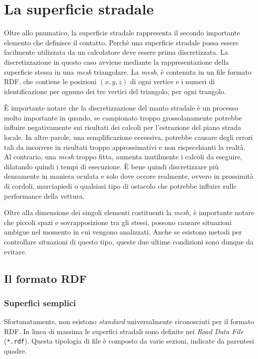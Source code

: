 \chapter{La superficie stradale}
\label{rdf}
%
Oltre allo pnumatico, la superficie stradale rappresenta il secondo importante elemento che definisce il contatto. Perchè una superficie stradale possa essere facilmente utilizzata da un calcolatore deve essere prima discretizzata. La discretizzazione in questo caso avviene mediante la rappresentazione della superficie stessa in una \textit{mesh} triangolare. La \textit{mesh}, è contenuta in un file formato \ac{RDF}, che contiene le posizioni $(x,y,z)$ di ogni vertice e i numeri di identificazione per ognuno dei tre vertici del triangolo, per ogni trangolo.

È importante notare che la discretizzazione del manto stradale è un processo molto importante in quando, se campionato troppo grossolanamente potrebbe influire negativamente sui risultati dei calcoli per l'estrazione del piano strada locale. In altre parole, una semplificazione eccessiva, potrebbe causare degli errori tali da incorrere in risultati troppo approssimativi e non rispecchianti la realtà. Al contrario, una \textit{mesh} troppo fitta, aumenta inutilmente i calcoli da eseguire, dilatando quindi i tempi di esecuzione. È bene quindi discretizzare più densamente in maniera oculata e solo dove occore realmente, ovvero in prossimità di cordoli, marciapiedi o qualsiasi tipo di ostacolo che potrebbe influire sulle performance della vettura.

Oltre alla dimensione dei singoli elementi costituenti la \textit{mesh}, è importante notare che piccoli spazi e sovrapposizione tra gli stessi, possono causare situazioni ambigue nel momento in cui vengono analizzati. Anche se esistono metodi per controllare situazioni di questo tipo, queste due ultime condizioni sono dunque da evitare.
%
\section{Il formato RDF}
%
\subsection{Superfici semplici}
Sfortunatamente, non esistono \textit{standard} universalmente riconosciuti per il formato RDF. In linea di massima le superfici stradali sono definite nei \textit{Road Data File} (\texttt{*.rdf}). Questa tipologia di file è composto da varie sezioni, indicate da parentesi quadre.

